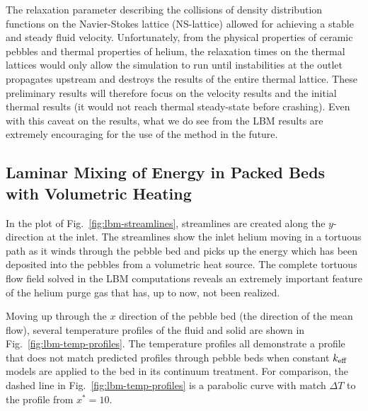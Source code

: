 
The relaxation parameter describing the collisions of density distribution functions on the Navier-Stokes lattice (NS-lattice) allowed for achieving a stable and steady fluid velocity. Unfortunately, from the physical properties of ceramic pebbles and thermal properties of helium, the relaxation times on the thermal lattices would only allow the simulation to run until instabilities at the outlet propagates upstream and destroys the results of the entire thermal lattice. These preliminary results will therefore focus on the velocity results and the initial thermal results (it would not reach thermal steady-state before crashing). Even with this caveat on the results, what we do see from the LBM results are extremely encouraging for the use of the method in the future.






\subsection{Laminar Mixing of Energy in Packed Beds with Volumetric Heating}

In the plot of Fig.~\ref{fig:lbm-streamlines}, streamlines are created along the $y$-direction at the inlet. The streamlines show the inlet helium moving in a tortuous path as it winds through the pebble bed and picks up the energy which has been deposited into the pebbles from a volumetric heat source. The complete tortuous flow field solved in the LBM computations reveals an extremely important feature of the helium purge gas that has, up to now, not been realized.

Moving up through the $x$ direction of the pebble bed (the direction of the mean flow), several temperature profiles of the fluid and solid are shown in Fig.~\ref{fig:lbm-temp-profiles}. The temperature profiles all demonstrate a profile that does not match predicted profiles through pebble beds when constant $k_\text{eff}$ models are applied to the bed in its continuum treatment. For comparison, the dashed line in Fig.~\ref{fig:lbm-temp-profiles} is a parabolic curve with match $\Delta T$ to the profile from $x^* = 10$. 

